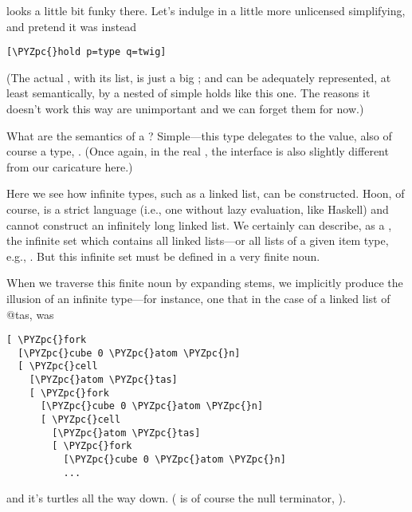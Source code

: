  looks a little bit funky there.  Let's indulge in a
little more unlicensed simplifying, and pretend it was instead

\begin{framed_shaded}
\begin{Verbatim}[fontsize=\relsize{-2.5},fontseries=b,commandchars=\\\{\}]
[\PYZpc{}hold p=type q=twig]
\end{Verbatim}
\end{framed_shaded}
(The actual , with its list, is just a big ; and can
be adequately represented, at least semantically, by a nested
 of simple holds like this one.  The reasons it doesn't
work this way are unimportant and we can forget them for now.)

What are the semantics of a ?  Simple---this type
delegates to the value, also of course a type, .
(Once again, in the real , the  interface
is also slightly different from our caricature here.)

Here we see how infinite types, such as a linked list, can be
constructed.  Hoon, of course, is a strict language (i.e., one
without lazy evaluation, like Haskell) and cannot construct an
infinitely long linked list.  We certainly can describe, as a
, the infinite set which contains all linked lists---or
all lists of a given item type, e.g., \kode{[p=type q=twig]}.  But this
infinite set must be defined in a very finite noun.

When we traverse this finite noun by expanding  stems, we
implicitly produce the illusion of an infinite type---for
instance, one that in the case of a linked list of @tas, was

\begin{framed_shaded}
\begin{Verbatim}[fontsize=\relsize{-2.5},fontseries=b,commandchars=\\\{\}]
[ \PYZpc{}fork
  [\PYZpc{}cube 0 \PYZpc{}atom \PYZpc{}n]
  [ \PYZpc{}cell
    [\PYZpc{}atom \PYZpc{}tas]
    [ \PYZpc{}fork
      [\PYZpc{}cube 0 \PYZpc{}atom \PYZpc{}n]
      [ \PYZpc{}cell
        [\PYZpc{}atom \PYZpc{}tas]
        [ \PYZpc{}fork
          [\PYZpc{}cube 0 \PYZpc{}atom \PYZpc{}n]
          ... 
\end{Verbatim}
\end{framed_shaded}
and it's turtles all the way down.  ( is of
course the null terminator, \kode{\sig }).

